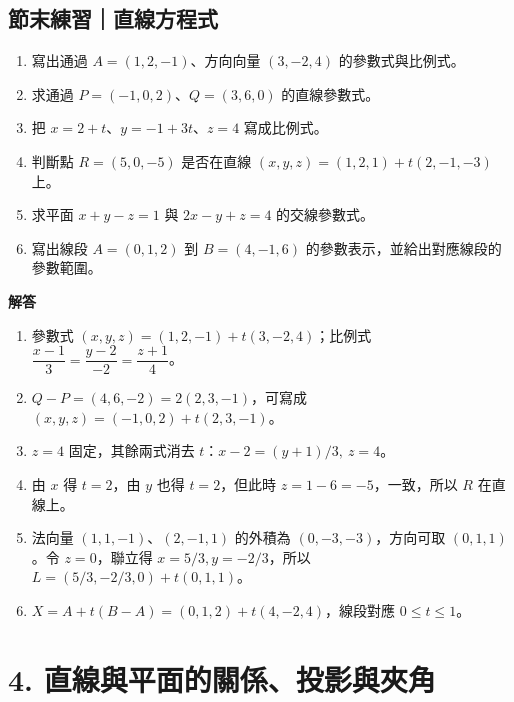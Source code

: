 \documentclass[11pt,a4paper]{article}
\providecommand{\tightlist}{%
  \setlength{\itemsep}{0pt}\setlength{\parskip}{0pt}}
\begin{document}
\begin{HandoutSelfCheck}

\subsection{節末練習｜直線方程式}\label{ux7bc0ux672bux7df4ux7fd2ux76f4ux7ddaux65b9ux7a0bux5f0f}

\begin{enumerate}
\def\labelenumi{\arabic{enumi}.}
\tightlist
\item
  寫出通過 \(A=(1,2,-1)\)、方向向量 \((3,-2,4)\) 的參數式與比例式。
\item
  求通過 \(P=(-1,0,2)\)、\(Q=(3,6,0)\) 的直線參數式。
\item
  把 \(x=2+t\)、\(y=-1+3t\)、\(z=4\) 寫成比例式。
\item
  判斷點 \(R=(5,0,-5)\) 是否在直線 \((x,y,z)=(1,2,1)+t(2,-1,-3)\) 上。
\item
  求平面 \(x+y-z=1\) 與 \(2x-y+z=4\) 的交線參數式。
\item
  寫出線段 \(A=(0,1,2)\) 到 \(B=(4,-1,6)\) 的參數表示，並給出對應線段的參數範圍。
\end{enumerate}

\textbf{解答}

\begin{enumerate}
\def\labelenumi{\arabic{enumi}.}
\tightlist
\item
  參數式 \((x,y,z)=(1,2,-1)+t(3,-2,4)\)；比例式 \(\dfrac{x-1}{3}=\dfrac{y-2}{-2}=\dfrac{z+1}{4}\)。
\item
  \(Q-P=(4,6,-2)=2(2,3,-1)\)，可寫成 \((x,y,z)=(-1,0,2)+t(2,3,-1)\)。
\item
  \(z=4\) 固定，其餘兩式消去 \(t\)：\(\boxed{x-2=(y+1)/3,\ z=4}\)。
\item
  由 \(x\) 得 \(t=2\)，由 \(y\) 也得 \(t=2\)，但此時 \(z=1-6=-5\)，一致，所以 \(R\) 在直線上。
\item
  法向量 \((1,1,-1)\)、\((2,-1,1)\) 的外積為 \((0,-3,-3)\)，方向可取 \((0,1,1)\)。令 \(z=0\)，聯立得 \(x=5/3,y=-2/3\)，所以 \(L=(5/3,-2/3,0)+t(0,1,1)\)。
\item
  \(X=A+t(B-A)=(0,1,2)+t(4,-2,4)\)，線段對應 \(\boxed{0\le t\le1}\)。
\end{enumerate}

\end{HandoutSelfCheck}

\section{4. 直線與平面的關係、投影與夾角}\label{ux76f4ux7ddaux8207ux5e73ux9762ux7684ux95dcux4fc2ux6295ux5f71ux8207ux593eux89d2}
\end{document}
